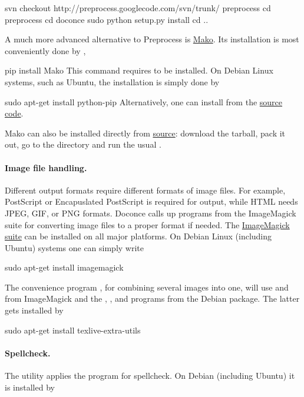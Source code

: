 \documentclass[%
oneside,                 %
final,                   %
10pt]{article}
\begin{document}
\bsys
svn checkout http://preprocess.googlecode.com/svn/trunk/ preprocess
cd preprocess
cd doconce
sudo python setup.py install
cd ..
\esys

A much more advanced alternative to Preprocess is
\href{{http://www.makotemplates.org}}{Mako}. Its installation is most
conveniently done by ,

\bsys
pip install Mako
\esys
This command requires  to be installed. On Debian Linux systems,
such as Ubuntu, the installation is simply done by

\bsys
sudo apt-get install python-pip
\esys
Alternatively, one can install from the  \href{{http://pypi.python.org/pypi/pip}}{source code}.

Mako can also be installed directly from
\href{{http://www.makotemplates.org/download.html}}{source}: download the
tarball, pack it out, go to the directory and run
the usual .

\paragraph{Image file handling.}
Different output formats require different formats of image files.
For example, PostScript or Encapuslated PostScript is required for 
output, while HTML needs JPEG, GIF, or PNG formats.
Doconce calls up programs from the ImageMagick suite for converting
image files to a proper format if needed. The \href{{http://www.imagemagick.org/script/index.php}}{ImageMagick suite} can be installed on all major platforms.
On Debian Linux (including Ubuntu) systems one can simply write

\bsys
sudo apt-get install imagemagick
\esys

The convenience program , for combining several
images into one, will use  and  from ImageMagick and
the , , and  programs from the 
Debian package. The latter gets installed by

\bsys
sudo apt-get install texlive-extra-utils
\esys

\paragraph{Spellcheck.}
The utility  applies the  program for
spellcheck. On Debian (including Ubuntu) it is installed by
\end{document}
